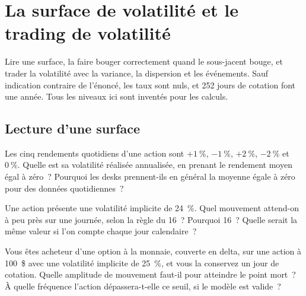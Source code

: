 \chapter{La surface de volatilité et le trading de volatilité}\label{ch:iv2:vol-surface-and-vol-trading}

\begin{ivtrains}
Lire une surface, la faire bouger correctement quand le sous-jacent bouge, et trader la volatilité avec la variance, la dispersion et les événements. Sauf indication contraire de l'énoncé, les taux sont nuls, et 252 jours de cotation font une année. Tous les niveaux ici sont inventés pour les calculs.
\end{ivtrains}

\section{Lecture d'une surface}

\begin{question}\label{iq:iv2:vol-surface-and-vol-trading:1}
Les cinq rendements quotidiens d'une action sont $+1~\%$, $-1~\%$, $+2~\%$, $-2~\%$ et $0~\%$. Quelle est sa volatilité réalisée annualisée, en prenant le rendement moyen égal à zéro~? Pourquoi les desks prennent-ils en général la moyenne égale à zéro pour des données quotidiennes~?
\end{question}

\begin{question}\label{iq:iv2:vol-surface-and-vol-trading:2}
Une action présente une volatilité implicite de 24~\%. Quel mouvement attend-on à peu près sur une journée, selon la règle du 16~? Pourquoi 16~? Quelle serait la même valeur si l'on compte chaque jour calendaire~?
\end{question}

\begin{question}\label{iq:iv2:vol-surface-and-vol-trading:3}
Vous êtes acheteur d'une option à la monnaie, couverte en delta, sur une action à 100~\$ avec une volatilité implicite de 25~\%, et vous la conservez un jour de cotation. Quelle amplitude de mouvement faut-il pour atteindre le point mort~? À quelle fréquence l'action dépassera-t-elle ce seuil, si le modèle est valide~?
\end{question}


